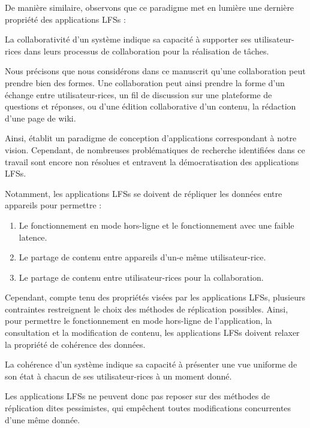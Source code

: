 De manière similaire, observons que ce paradigme met en lumière une dernière propriété des applications \acp{LFS} :
\begin{definition}[Collaborativité]
  \label{def:collaborative}
  La collaborativité d'un système indique sa capacité à supporter ses utilisateur-rices dans leurs processus de collaboration pour la réalisation de tâches.
\end{definition}
Nous précisons que nous considérons dans ce manuscrit qu'une collaboration peut prendre bien des formes.
Une collaboration peut ainsi prendre la forme d'un échange entre utilisateur-rices, \eg un fil de discussion sur une plateforme de questions et réponses, ou d'une édition collaborative d'un contenu, \eg la rédaction d'une page de wiki.


Ainsi, \cite{localfirstsoftware2019} établit un paradigme de conception d'applications correspondant à notre vision.
Cependant, de nombreuses problématiques de recherche identifiées dans ce travail sont encore non résolues et entravent la démocratisation des applications \acp{LFS}.

Notamment, les applications \acp{LFS} se doivent de répliquer les données entre appareils pour permettre :
\begin{enumerate}
  \item Le fonctionnement en mode hors-ligne et le fonctionnement avec une faible latence.
  \item Le partage de contenu entre appareils d'un-e même utilisateur-rice.
  \item Le partage de contenu entre utilisateur-rices pour la collaboration.
\end{enumerate}

Cependant, compte tenu des propriétés visées par les applications \acp{LFS}, plusieurs contraintes restreignent le choix des méthodes de réplication possibles.
Ainsi, pour permettre le fonctionnement en mode hors-ligne de l'application, \ie la consultation et la modification de contenu, les applications \acp{LFS} doivent relaxer la propriété de cohérence des données.
\begin{definition}[Cohérence]
  La cohérence d'un système indique sa capacité à présenter une vue uniforme de son état à chacun de ses utilisateur-rices à un moment donné.
\end{definition}
Les applications \acp{LFS} ne peuvent donc pas reposer sur des méthodes de réplication dites pessimistes, \ie qui empêchent toutes modifications concurrentes d'une même donnée.

